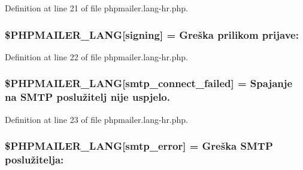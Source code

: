 Definition at line 21 of file phpmailer.\+lang-\/hr.\+php.

\subsubsection[{\texorpdfstring{\$\+P\+H\+P\+M\+A\+I\+L\+E\+R\+\_\+\+L\+A\+NG}{$PHPMAILER_LANG}}]{\setlength{\rightskip}{0pt plus 5cm}\$P\+H\+P\+M\+A\+I\+L\+E\+R\+\_\+\+L\+A\+NG\mbox{[}\textquotesingle{}signing\textquotesingle{}\mbox{]} = \textquotesingle{}Greška prilikom prijave\+: \textquotesingle{}}\hypertarget{phpmailer_8lang-hr_8php_a68e437bdb9b968a5a67320f03d231565}{}\label{phpmailer_8lang-hr_8php_a68e437bdb9b968a5a67320f03d231565}


Definition at line 22 of file phpmailer.\+lang-\/hr.\+php.

\subsubsection[{\texorpdfstring{\$\+P\+H\+P\+M\+A\+I\+L\+E\+R\+\_\+\+L\+A\+NG}{$PHPMAILER_LANG}}]{\setlength{\rightskip}{0pt plus 5cm}\$P\+H\+P\+M\+A\+I\+L\+E\+R\+\_\+\+L\+A\+NG\mbox{[}\textquotesingle{}smtp\+\_\+connect\+\_\+failed\textquotesingle{}\mbox{]} = \textquotesingle{}Spajanje na {\bf S\+M\+TP} poslužitelj nije uspjelo.\textquotesingle{}}\hypertarget{phpmailer_8lang-hr_8php_a7b321d4ca1e9df702403ed4c61aa0980}{}\label{phpmailer_8lang-hr_8php_a7b321d4ca1e9df702403ed4c61aa0980}


Definition at line 23 of file phpmailer.\+lang-\/hr.\+php.

\subsubsection[{\texorpdfstring{\$\+P\+H\+P\+M\+A\+I\+L\+E\+R\+\_\+\+L\+A\+NG}{$PHPMAILER_LANG}}]{\setlength{\rightskip}{0pt plus 5cm}\$P\+H\+P\+M\+A\+I\+L\+E\+R\+\_\+\+L\+A\+NG\mbox{[}\textquotesingle{}smtp\+\_\+error\textquotesingle{}\mbox{]} = \textquotesingle{}Greška {\bf S\+M\+TP} poslužitelja\+: \textquotesingle{}}\hypertarget{phpmailer_8lang-hr_8php_a7d9cffba1e669c845f8a4c891ee50064}{}\label{phpmailer_8lang-hr_8php_a7d9cffba1e669c845f8a4c891ee50064}


